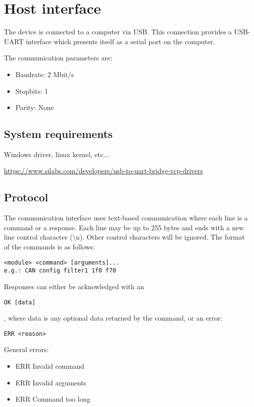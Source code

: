 \documentclass{article}[a4paper]
\begin{document}
\section{Host interface}

The device is connected to a computer via USB. This connection provides a
USB-UART interface which presents itself as a serial port on the computer.

The communication parameters are:
\begin{itemize}
\item Baudrate: 2 Mbit/s
\item Stopbits: 1
\item Parity: None
\end{itemize}

\subsection{System requirements}

Windows driver, linux kernel, etc...

\url{https://www.silabs.com/developers/usb-to-uart-bridge-vcp-drivers}

\subsection{Protocol}

The communication interface uses text-based communication where each line is a
command or a response. Each line may be up to 255 bytes and ends with a new
line control character
(\textbackslash n). Other control characters will be ignored. The format of
the commands is as follows:
\begin{verbatim}
<module> <command> [arguments]...
e.g.: CAN config filter1 1f0 f70
\end{verbatim}

Responses can either be acknowledged with an
\begin{verbatim}
OK [data]
\end{verbatim}
, where data is any optional data returned by the command, or an error:
\begin{verbatim}
ERR <reason>
\end{verbatim}

General errors:
\begin{itemize}
\item ERR Invalid command
\item ERR Invalid arguments
\item ERR Command too long
\end{itemize}
\end{document}
